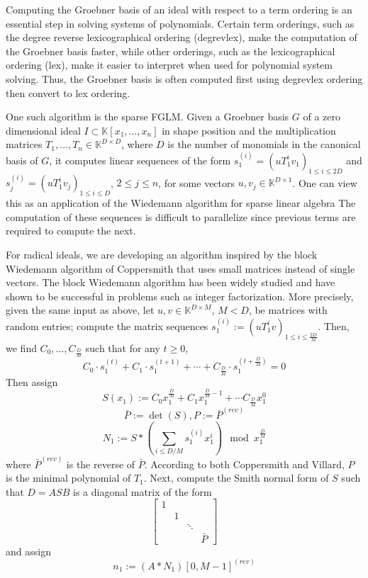 \documentclass[12pt]{article}
\begin{document}
Computing the Groebner basis of an ideal with respect to a term ordering 
is an essential step in solving systems of polynomials.
Certain term orderings, such as the degree reverse lexicographical ordering (degrevlex),
make the computation of the Groebner basis faster, while other orderings, 
such as the lexicographical ordering (lex), make it easier to interpret when
used for polynomial system solving. Thus, the Groebner basis is often computed
first using degrevlex ordering then convert to lex ordering.

One such algorithm is the sparse FGLM. Given a Groebner basis $G$ of a zero 
dimensional ideal $I \subset \mathbb{K}[x_1, \dots, x_n]$ 
in shape position and the multiplication matrices $T_1,\dots, T_n \in \mathbb{K}^{D \times D}$,
where $D$ is the number of monomials in the canonical basis of $G$, it computes 
linear sequences of the form $s_1^{(i)} = (uT_1^iv_1)_{1\le i \le 2D}$ and
$s_j^{(i)} = (uT_1^iv_j)_{1\le i \le D}$, $2 \le j \le n$, for some vectors $u,v_j \in 
\mathbb{K}^{D\times 1}$. One can view this as an application of the Wiedemann algorithm 
for sparse linear algebra The computation of these sequences is difficult to parallelize 
since previous terms are required to compute the next. 

For radical ideals, we are developing an algorithm inspired by the block Wiedemann algorithm of Coppersmith
that uses small matrices instead of single vectors. The block Wiedemann algorithm has been 
widely studied and have shown to be successful in problems such as integer factorization.
More precisely, given the same input as above, let $u,v \in \mathbb{K}^{D \times M}$, $M < D$, be 
matrices with random entries; compute the matrix sequences $s_1^{(i)} := (uT_1^iv)_{1\le i \le \frac{2D}{M}}$. 
Then, we find $C_0, \dots, C_\frac{D}{M}$ such that for any $t \ge 0$,
$$ C_0 \cdot s_1^{(t)} + C_1 \cdot s_1^{(t+1)} + \cdots + C_{\frac{D}{M}} \cdot s_1^{(t+\frac{D}{M})}  = 0$$
Then assign
$$ S(x_1) := C_0  x_1^{\frac{D}{M}} + C_1  x_1^{\frac{D}{M} - 1} + \cdots C_{\frac{D}{M}} x_1^0$$
$$ \bar{P} := \det(S) , P := \bar{P}^{(rev)}$$
$$ N_1 := S * (\sum_{i\le D/M} s_1^{(i)} x_1^i) \mod x_1^{\frac{D}{M}}$$
where $\bar{P}^{(rev)}$ is the reverse of $\bar{P}$. According to both Coppersmith and Villard,
$P$ is the minimal polynomial of $T_1$. Next, compute the Smith normal form 
of $S$ such that $D = A S B$ is a diagonal matrix of the form
$$\begin{bmatrix}
	1 &  &        & \\
	  & 1&        &  \\ 
	  &  & \ddots & \\
	  &  &        & \bar{P}
\end{bmatrix}$$
and assign
$$ n_1 := (A*N_1)[0,M-1]^{(rev)}$$
\end{document}

